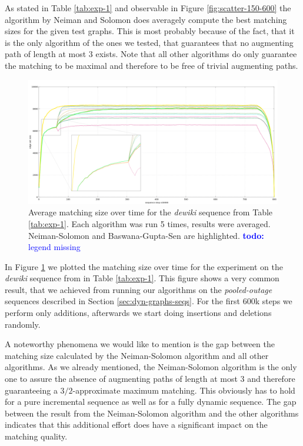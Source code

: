 \documentclass{article}      %
\newcommand\todo[1]{\textcolor{blue}{\textbf{todo: }#1}}
\begin{document}

\bigskip \noindent
As stated in Table \ref{tab:exp-1} and observable in Figure \ref{fig:scatter-150-600} the algorithm by Neiman and Solomon does averagely compute the best matching sizes for the given test graphs. This is most probably because of the fact, that it is the only algorithm of the ones we tested, that guarantees that no augmenting path of length at most $3$ exists. Note that all other algorithms do only guarantee the matching to be maximal and therefore to be free of trivial augmenting paths.

\begin{figure}
	\centering
	\includegraphics[width=\textwidth]{img/ns_bgs.png}
	\caption{Average matching size over time for the \emph{dewiki} sequence from Table \ref{tab:exp-1}. Each algorithm was run 5 times, results were averaged. Neiman-Solomon and Baswana-Gupta-Sen are highlighted. \todo{legend missing}}
	\label{fig:ns-bgs-mq}
\end{figure}

In Figure \ref{fig:ns-bgs-mq} we plotted the matching size over time for the experiment on the \emph{dewiki} sequence from in Table \ref{tab:exp-1}. This figure shows a very common result, that we achieved from running our algorithms on the \emph{pooled-outage} sequences described in Section \ref{sec:dyn-graphs-seqs}. For the first $600$k steps we perform only additions, afterwards we start doing insertions and deletions randomly.

A noteworthy phenomena we would like to mention is the gap between the matching size calculated by the Neiman-Solomon algorithm and all other algorithms.%
As we already mentioned, the Neiman-Solomon algorithm is the only one to assure the absence of augmenting paths of length at most $3$ and therefore guaranteeing a $3/2$-approximate maximum matching. This obviously has to hold for a pure incremental sequence as well as for a fully dynamic sequence. The gap between the result from the Neiman-Solomon algorithm and the other algorithms indicates that this additional effort does have a significant impact on the matching quality.
\end{document}
